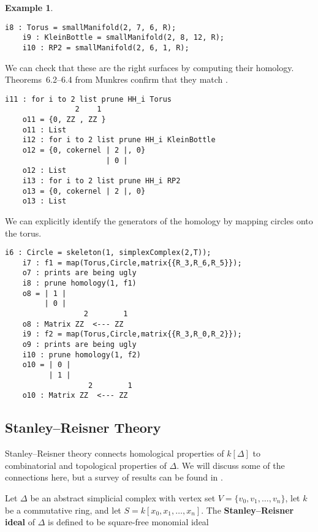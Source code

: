 \documentclass[12pt,leqno]{amsart}
\theoremstyle{definition}
\newtheorem{example}[lemma]{Example}
\begin{document}
\begin{example}
  \label{E: common surfaces and homology}
\begin{lstlisting}[basicstyle={\ttfamily \scriptsize}, xleftmargin=-23pt]
    i8 : Torus = smallManifold(2, 7, 6, R);
    i9 : KleinBottle = smallManifold(2, 8, 12, R);
    i10 : RP2 = smallManifold(2, 6, 1, R);
\end{lstlisting}
  We can check that these are the right surfaces by computing their
  homology. Theorems~6.2--6.4 from Munkres confirm that they match
  \cite{Munkres}.
\begin{lstlisting}[basicstyle={\ttfamily \scriptsize}, xleftmargin=-23pt]
    i11 : for i to 2 list prune HH_i Torus
                2    1
    o11 = {0, ZZ , ZZ }
    o11 : List
    i12 : for i to 2 list prune HH_i KleinBottle
    o12 = {0, cokernel | 2 |, 0}
                       | 0 |
    o12 : List
    i13 : for i to 2 list prune HH_i RP2
    o13 = {0, cokernel | 2 |, 0}
    o13 : List
\end{lstlisting}
  We can explicitly identify the generators of the homology by mapping circles
  onto the torus.
\begin{lstlisting}[basicstyle={\ttfamily \scriptsize}, xleftmargin=-23pt]
    i6 : Circle = skeleton(1, simplexComplex(2,T));
    i7 : f1 = map(Torus,Circle,matrix{{R_3,R_6,R_5}});
    o7 : prints are being ugly
    i8 : prune homology(1, f1)
    o8 = | 1 |
         | 0 |
                  2        1
    o8 : Matrix ZZ  <--- ZZ
    i9 : f2 = map(Torus,Circle,matrix{{R_3,R_0,R_2}});
    o9 : prints are being ugly
    i10 : prune homology(1, f2)
    o10 = | 0 |
          | 1 |
                   2        1
    o10 : Matrix ZZ  <--- ZZ
\end{lstlisting}
\end{example}

\addtocounter{section}{1}
\subsection{Stanley--Reisner Theory}
\label{S:Stanley--Reisner Theory}

\noindent
Stanley--Reisner theory connects homological properties of $k[\Delta]$ to
combinatorial and topological properties of $\Delta$. We will discuss some of
the connections here, but a survey of results can be found in
\cites{BH, Stanley, MS}.

Let $\Delta$ be an abstract simplicial complex with vertex set
$V = \{v_0,v_1,\dotsc,v_n\}$, let $k$ be a commutative ring, and let
$S = k[x_0,x_1,\dotsc,x_n]$. The \textbf{Stanley--Reisner ideal} of $\Delta$
is defined to be square-free monomial ideal
\end{document}
